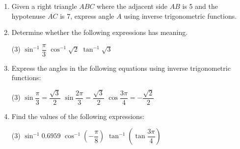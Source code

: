 \documentclass{report}
\begin{document}
\begin{enumerate}
    \item Given a right triangle \(ABC\) where the adjacent side \(AB\) is 5 and the hypotenuse \(AC\) is 7, express angle \(A\) using inverse trigonometric functions.
    
    \item Determine whether the following expressions has meaning.
    \begin{tasks}(3)
        \task \( \sin^{-1} \dfrac{\pi}{3} \)
        \task \( \cos^{-1} \sqrt{2} \)
        \task \( \tan^{-1} \sqrt{3} \)
    \end{tasks}
    
    \item Express the angles in the following equations using inverse trigonometric functions:
    \begin{tasks}(3)
        \task \( \sin \dfrac{\pi}{3}=\dfrac{\sqrt{3}}{2} \)
        \task \( \sin \dfrac{2\pi}{3}=\dfrac{\sqrt{3}}{2} \)
        \task \( \cos \dfrac{3\pi}{4}=-\dfrac{\sqrt{2}}{2} \)
    \end{tasks}
    
    \item Find the values of the following expressions:
    \begin{tasks}(3)
        \task \( \sin^{-1} 0.6959 \)
        \task \( \cos^{-1}\left(-\dfrac{\pi}{8}\right) \)
        \task \( \tan^{-1}\left(\tan \dfrac{3\pi}{4}\right) \)
    \end{tasks}
\end{enumerate}
\end{document}
